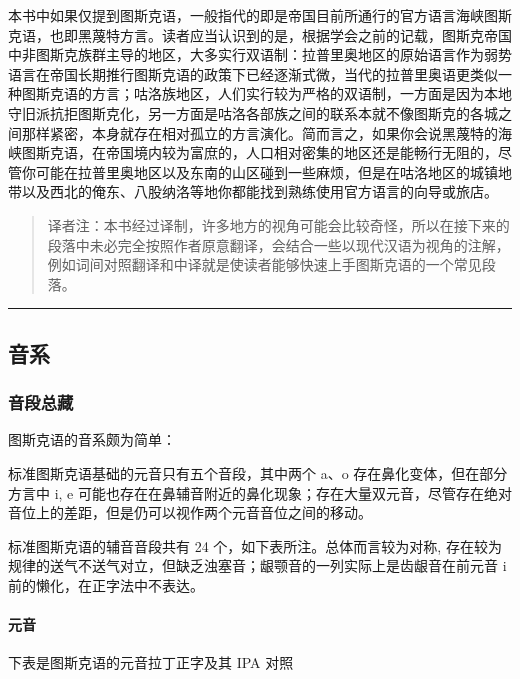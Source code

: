 \documentclass{article}
\begin{document}
本书中如果仅提到图斯克语，一般指代的即是帝国目前所通行的官方语言海峡图斯克语，也即黑蔑特方言。读者应当认识到的是，根据学会之前的记载，图斯克帝国中非图斯克族群主导的地区，大多实行双语制：拉普里奥地区的原始语言作为弱势语言在帝国长期推行图斯克语的政策下已经逐渐式微，当代的拉普里奥语更类似一种图斯克语的方言；咕洛族地区，人们实行较为严格的双语制，一方面是因为本地守旧派抗拒图斯克化，另一方面是咕洛各部族之间的联系本就不像图斯克的各城之间那样紧密，本身就存在相对孤立的方言演化。简而言之，如果你会说黑蔑特的海峡图斯克语，在帝国境内较为富庶的，人口相对密集的地区还是能畅行无阻的，尽管你可能在拉普里奥地区以及东南的山区碰到一些麻烦，但是在咕洛地区的城镇地带以及西北的俺东、八股纳洛等地你都能找到熟练使用官方语言的向导或旅店。

\begin{quote}
译者注：本书经过译制，许多地方的视角可能会比较奇怪，所以在接下来的段落中未必完全按照作者原意翻译，会结合一些以现代汉语为视角的注解，例如词间对照翻译和中译就是使读者能够快速上手图斯克语的一个常见段落。
\end{quote}

\begin{center}\rule{0.5\linewidth}{0.5pt}\end{center}

\subsection{音系}\label{ux97f3ux7cfb}

\subsubsection{音段总藏}\label{ux97f3ux6bb5ux603bux85cf}

图斯克语的音系颇为简单：

标准图斯克语基础的元音只有五个音段，其中两个 a、o
存在鼻化变体，但在部分方言中 i, e
可能也存在在鼻辅音附近的鼻化现象；存在大量双元音，尽管存在绝对音位上的差距，但是仍可以视作两个元音音位之间的移动。

标准图斯克语的辅音音段共有 24 个，如下表所注。总体而言较为对称,
存在较为规律的送气不送气对立，但缺乏浊塞音；龈颚音的一列实际上是齿龈音在前元音
i 前的懒化，在正字法中不表达。

\paragraph{元音}\label{ux5143ux97f3}

下表是图斯克语的元音拉丁正字及其 IPA 对照
\end{document}
